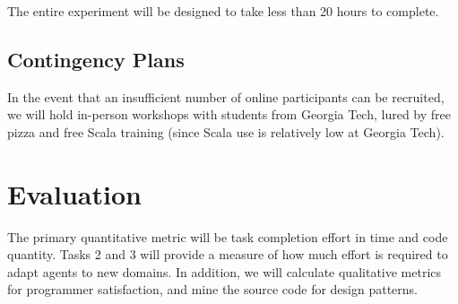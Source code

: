 \begin{appendices}
The entire experiment will be designed to take less than 20 hours to complete.

\subsection{Contingency Plans}

In the event that an insufficient number of online participants can be recruited, we will hold in-person workshops with students from Georgia Tech, lured by free pizza and free Scala training (since Scala use is relatively low at Georgia Tech).

\section{Evaluation}

The primary quantitative metric will be task completion effort in time and code quantity.  Tasks 2 and 3 will provide a measure of how much effort is required to adapt agents to new domains.  In addition, we will calculate qualitative metrics for programmer satisfaction, and mine the source code for design patterns.

\end{appendices}
